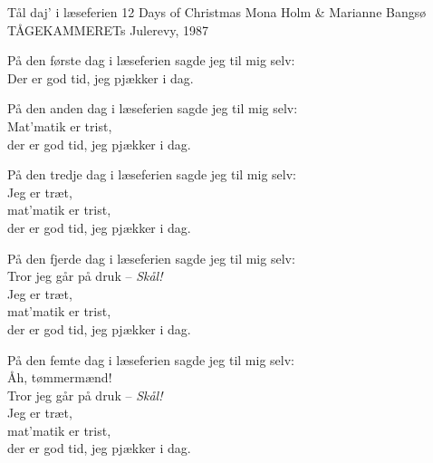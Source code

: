 \begin{song}{Tål daj' i læseferien}
  {} %
  {12 Days of Christmas} %
  {Mona Holm \& Marianne Bangsø} %
  {TÅGEKAMMERETs Julerevy, 1987} %
  {\NotCCLIed} %

  \begin{SBVerse}
    På den første dag i læseferien sagde jeg til mig selv:\\
    Der er god tid, jeg pjækker i dag.
  \end{SBVerse}

  \begin{SBVerse}
    På den anden dag i læseferien sagde jeg til mig selv:\\
    Mat’matik er trist,\\
    der er god tid, jeg pjækker i dag.
  \end{SBVerse}

  \begin{SBVerse}
    På den tredje dag i læseferien sagde jeg til mig selv:\\
    Jeg er træt,\\
    mat’matik er trist,\\
    der er god tid, jeg pjækker i dag.
  \end{SBVerse}

  \begin{SBVerse}
    På den fjerde dag i læseferien sagde jeg til mig selv:\\
    Tror jeg går på druk -- \emph{Skål!}\\
    Jeg er træt,\\
    mat’matik er trist,\\
    der er god tid, jeg pjækker i dag.
  \end{SBVerse}

  \begin{SBVerse}
    På den femte dag i læseferien sagde jeg til mig selv:\\
    Åh, tømmermænd!\\
    Tror jeg går på druk -- \emph{Skål!}\\
    Jeg er træt,\\
    mat’matik er trist,\\
    der er god tid, jeg pjækker i dag.
  \end{SBVerse}


\end{song}
